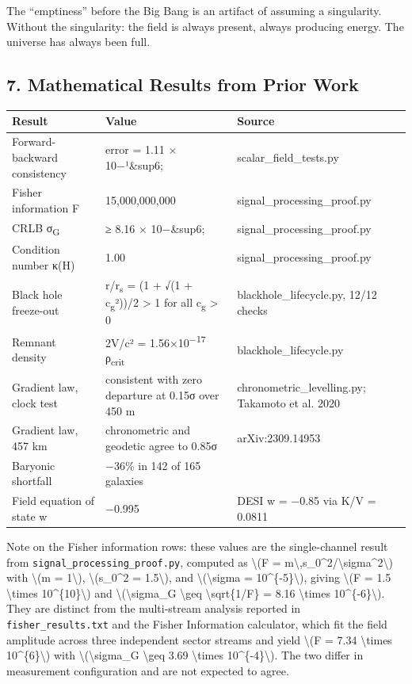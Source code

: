 \documentclass[
  10pt,
]{article}
\begin{document}
The ``emptiness'' before the Big Bang is an artifact of assuming a
singularity. Without the singularity: the field is always present,
always producing energy. The universe has always been full.

\hypertarget{mathematical-results-from-prior-work}{%
\subsection{7. Mathematical Results from Prior
Work}\label{mathematical-results-from-prior-work}}

\begin{longtable}[]{@{}lll@{}}
\toprule\noalign{}
Result & Value & Source \\
\midrule\noalign{}
\endhead
\bottomrule\noalign{}
\endlastfoot
Forward-backward consistency & error = 1.11 × 10−¹\&sup6; &
scalar\_field\_tests.py \\
Fisher information F & 15,000,000,000 & signal\_processing\_proof.py \\
CRLB σ\textsubscript{G} & ≥ 8.16 × 10−\&sup6; &
signal\_processing\_proof.py \\
Condition number κ(H) & 1.00 & signal\_processing\_proof.py \\
Black hole freeze-out & r/r\textsubscript{s} = (1 + √(1 +
c\textsubscript{g}²))/2 \textgreater{} 1 for all c\textsubscript{g}
\textgreater{} 0 & blackhole\_lifecycle.py, 12/12 checks \\
Remnant density & 2V/c² = 1.56×10\textsuperscript{−17}
ρ\textsubscript{crit} & blackhole\_lifecycle.py \\
Gradient law, clock test & consistent with zero departure at 0.15σ over
450 m & chronometric\_levelling.py; Takamoto et al. 2020 \\
Gradient law, 457 km & chronometric and geodetic agree to 0.85σ &
arXiv:2309.14953 \\
Baryonic shortfall & −36\% in 142 of 165 galaxies & \\
Field equation of state w & −0.995 & DESI w = −0.85 via K/V = 0.0811 \\
\end{longtable}

Note on the Fisher information rows: these values are the single-channel
result from \texttt{signal\_processing\_proof.py}, computed as
\textbackslash(F =
m\textbackslash,s\_0\^{}2/\textbackslash sigma\^{}2\textbackslash) with
\textbackslash(m = 1\textbackslash), \textbackslash(s\_0\^{}2 =
1.5\textbackslash), and \textbackslash(\textbackslash sigma =
10\^{}\{-5\}\textbackslash), giving \textbackslash(F = 1.5
\textbackslash times 10\^{}\{10\}\textbackslash) and
\textbackslash(\textbackslash sigma\_G \textbackslash geq
\textbackslash sqrt\{1/F\} = 8.16 \textbackslash times
10\^{}\{-6\}\textbackslash). They are distinct from the multi-stream
analysis reported in \texttt{fisher\_results.txt} and the Fisher
Information calculator, which fit the field amplitude across three
independent sector streams and yield \textbackslash(F = 7.34
\textbackslash times 10\^{}\{6\}\textbackslash) with
\textbackslash(\textbackslash sigma\_G \textbackslash geq 3.69
\textbackslash times 10\^{}\{-4\}\textbackslash). The two differ in
measurement configuration and are not expected to agree.
\end{document}
